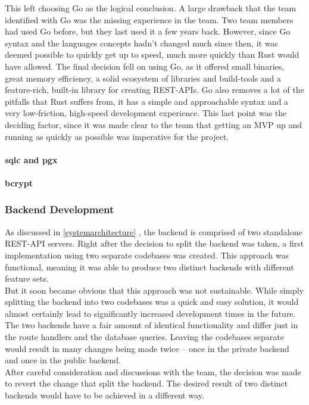 \noindent
This left choosing Go as the logical conclusion.
A large drawback that the team identified with Go was the missing experience in the team. Two team members had used Go before, but they last used it a few years back.
However, since Go syntax and the languages concepts hadn't changed much since then, it was deemed possible to quickly get up to speed, much more quickly than Rust would have allowed.
The final decision fell on using Go, as it offered small binaries, great memory efficiency, a solid ecosystem of libraries and build-tools and a feature-rich, built-in library for creating REST-APIs.
Go also removes a lot of the pitfalls that Rust suffers from, it has a simple and approachable syntax and a very low-friction, high-speed development experience.
This last point was the deciding factor, since it was made clear to the team that getting an MVP up and running as quickly as possible was imperative for the project.
\paragraph{sqlc and pgx}
\paragraph{bcrypt}

\subsubsection{Backend Development}
As discussed in \ref{systemarchitecture} , the backend is comprised of two standalone REST-API servers.
Right after the decision to split the backend was taken, a first implementation using two separate codebases was created.
This approach was functional, meaning it was able to produce two distinct backends with different feature sets. \\

\noindent
But it soon became obvious that this approach was not sustainable.
While simply splitting the backend into two codebases was a quick and easy solution, it would almost certainly lead to significantly increased development times in the future.
The two backends have a fair amount of identical functionality and differ just in the route handlers and the database queries.
Leaving the codebases separate would result in many changes being made twice -- once in the private backend and once in the public backend.\\

\noindent
After careful consideration and discussions with the team, the decision was made to revert the change that split the backend.
The desired result of two distinct backends would have to be achieved in a different way. \\

